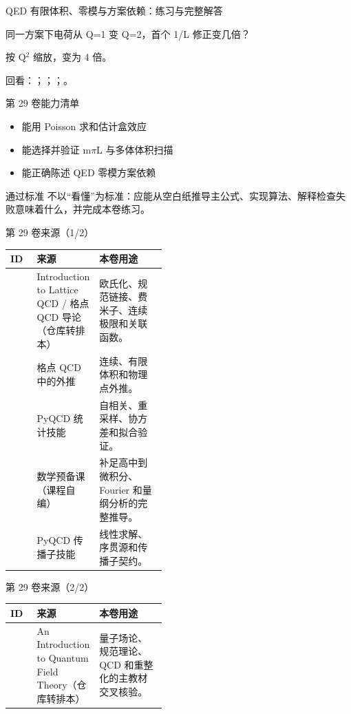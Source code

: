 \begin{frame}[t]{QED 有限体积、零模与方案依赖：练习与完整解答}
\footnotesize
\begin{block}{}同一方案下电荷从 Q=1 变 Q=2，首个 1/\allowbreak{}L 修正变几倍？\end{block}
\begin{exampleblock}{}按 Q\ensuremath{^{2}} 缩放，变为 4 倍。\end{exampleblock}
\vfill
\scriptsize 回看：；；；。
\end{frame}

\begin{frame}[t]{第 29 卷能力清单}
\small\begin{itemize}
\item[\CheckMark] 能用 Poisson 求和估计盒效应
\item[\CheckMark] 能选择并验证 m\ensuremath{\pi}L 与多体体积扫描
\item[\CheckMark] 能正确陈述 QED 零模方案依赖
\end{itemize}\vfill\begin{block}{通过标准}
不以“看懂”为标准：应能从空白纸推导主公式、实现算法、解释检查失败意味着什么，并完成本卷练习。
\end{block}\end{frame}

\begin{frame}[t]{第 29 卷来源（1/2）}
\scriptsize\begin{tabularx}{\linewidth}{p{0.17\linewidth}p{0.28\linewidth}Y}
\toprule ID & 来源 & 本卷用途\\\midrule
{} & Introduction to Lattice QCD /\allowbreak{} 格点 QCD 导论（仓库转排本） & 欧氏化、规范链接、费米子、连续极限和关联函数。\\
 & 格点 QCD 中的外推 & 连续、有限体积和物理点外推。\\
 & PyQCD 统计技能 & 自相关、重采样、协方差和拟合验证。\\
 & 数学预备课（课程自编） & 补足高中到微积分、Fourier 和量纲分析的完整推导。\\
 & PyQCD 传播子技能 & 线性求解、序贯源和传播子契约。\\
\bottomrule\end{tabularx}\end{frame}

\begin{frame}[t]{第 29 卷来源（2/2）}
\scriptsize\begin{tabularx}{\linewidth}{p{0.17\linewidth}p{0.28\linewidth}Y}
\toprule ID & 来源 & 本卷用途\\\midrule
{} & An Introduction to Quantum Field Theory（仓库转排本） & 量子场论、规范理论、QCD 和重整化的主教材交叉核验。\\
\bottomrule\end{tabularx}\end{frame}

